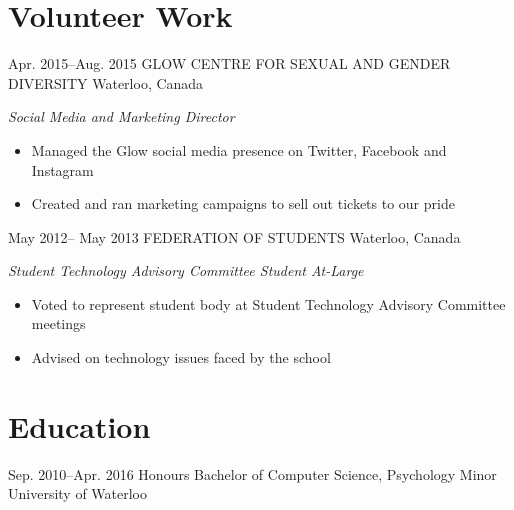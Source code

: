 \documentclass[]{friggeri-cv} %
\begin{document}
\vspace{-2\parskip}
\section{Volunteer Work}


\begin{sectionlist}
	
	\entry
	{Apr. 2015--Aug. 2015}
	{GLOW CENTRE FOR SEXUAL AND GENDER DIVERSITY}
	{Waterloo, Canada}
	{\emph{Social Media and Marketing Director} \\
		\begin{itemize}
			\item Managed the Glow social media presence on Twitter, Facebook and Instagram
			\item Created and ran marketing campaigns to sell out tickets to our pride 
		\end{itemize}
	}
	
	
	\entry
	{May 2012-- May 2013}
	{FEDERATION OF STUDENTS}
	{Waterloo, Canada}
	{\emph{Student Technology Advisory Committee Student At-Large} \\
		\begin{itemize}
			\item Voted to represent student body at Student Technology Advisory Committee meetings
			\item Advised on technology issues faced by the school
		\end{itemize}
	}	
	
	
\end{sectionlist}

\vspace{-2\parskip}
\section{Education}

\begin{sectionlist}
		
	\education
	{Sep. 2010--Apr. 2016}
	{Honours Bachelor of Computer Science, Psychology Minor}
	{University of Waterloo}
\end{sectionlist}
\end{document}
